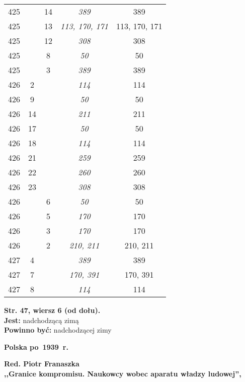 \documentclass[a4paper,11pt]{article}
\newcommand{\spaceTwo}{2em}
\newcommand{\spaceThree}{1em}
\newcommand{\tb}{\textbf}
\newcommand{\noi}{\noindent}
\newcommand{\StrWd}[2]{\tb{Str. #1, wiersz #2 (od dołu).}}
\newcommand{\Jest}{\tb{Jest: }}
\newcommand{\Pow}{\tb{Powinno być: }}
\newcommand{\Work}[1]{ \begin{center} {\large \tb{#1}} \end{center} }
\begin{document}
\begin{center}
\begin{tabular}{|c|c|c|c|c|}
    425 & & 14 & \emph{389} & 389 \\
    425 & & 13 & \emph{113, 170, 171} & 113, 170, 171 \\
    425 & & 12 & \emph{308} & 308 \\
    425 & &  8 & \emph{50}  &  50 \\
    425 & &  3 & \emph{389} & 389 \\
    426 &  2 & & \emph{114} & 114 \\
    426 &  9 & & \emph{50}  &  50 \\
    426 & 14 & & \emph{211} & 211 \\
    426 & 17 & & \emph{50}  &  50 \\
    426 & 18 & & \emph{114} & 114 \\
    426 & 21 & & \emph{259} & 259 \\
    426 & 22 & & \emph{260} & 260 \\
    426 & 23 & & \emph{308} & 308 \\
    426 & & 6 & \emph{50}  &  50 \\
    426 & & 5 & \emph{170} & 170 \\
    426 & & 3 & \emph{170} & 170 \\
    426 & & 2 & \emph{210, 211} & 210, 211 \\
    427 & 4 & & \emph{389} & 389 \\
    427 & 7 & & \emph{170, 391} & 170, 391 \\
    427 & 8 & & \emph{114} & 114 \\
    \hline
  \end{tabular}
\end{center}
\noi
\StrWd{47}{6} \\
\Jest nadchodzącą zimą \\
\Pow  nadchodzącej zimy \\

\vspace{\spaceTwo}






\vspace{\spaceTwo}

\Work{Polska po~1939~r.}

\vspace{\spaceTwo} \vspace{\spaceThree}



\Work{
  Red. Piotr Franaszka \\
  ,,Granice kompromisu. Naukowcy wobec aparatu władzy ludowej'',
  \cite{RedFranaszkaGraniceKompromisu15} }
\end{document}
